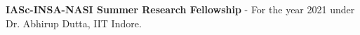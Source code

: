 \documentclass[9pt]{developercv} %
\begin{document}
	\textbf{IASc-INSA-NASI Summer Research Fellowship} - For the year 2021 under Dr. Abhirup Dutta, IIT Indore.

\end{document}
